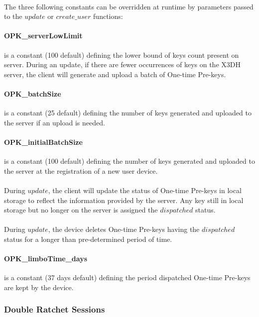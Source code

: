 \documentclass[a4paper,11pt]{article}
\begin{document}
      \paragraph{}The three following constants can be overridden at runtime by parameters passed to the $update$ or $create\_user$ functions:
      \paragraph{OPK\_serverLowLimit}is a constant (100 default) defining the lower bound of keys count present on server. During an update, if there are fewer occurrences of keys on the X3DH server, the client will generate and upload a batch of One-time Pre-keys.
      \paragraph{OPK\_batchSize} is a constant (25 default) defining the number of keys generated and uploaded to the server if an upload is needed.
      \paragraph{OPK\_initialBatchSize}is a constant (100 default) defining the number of keys generated and uploaded to the server at the registration of a new user device.
      \paragraph{}During $update$, the client will update the status of One-time Pre-keys in local storage to reflect the information provided by the server. Any key still in local storage but no longer on the server is assigned the $dispatched$ status.
      \paragraph{}During $update$, the device deletes One-time Pre-keys having the $dispatched$ status for a longer than pre-determined period of time.
      \paragraph{OPK\_limboTime\_days} is a constant (37 days default) defining the period dispatched One-time Pre-keys are kept by the device.

    \subsubsection{Double Ratchet Sessions}
\end{document}
